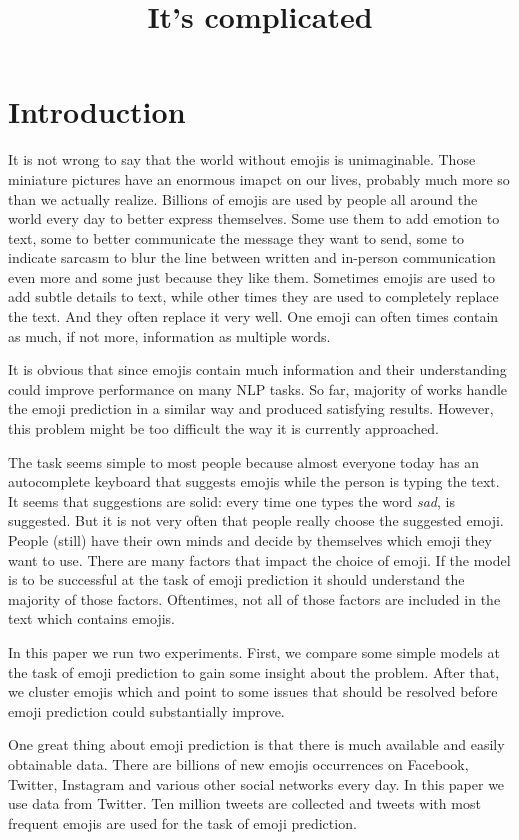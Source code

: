 \documentclass[10pt, a4paper]{article}
\title{It's complicated \emoji{1F384}}
\begin{document}
\maketitleabstract

\section{Introduction}
It is not wrong to say that the world without emojis is unimaginable. Those 
miniature pictures have an enormous imapct on our lives, probably much more so than
we actually realize. Billions of emojis are used by people all around the world 
every day to better express themselves. Some use them to add emotion to text, 
some to better communicate the message they want to send, some to indicate 
sarcasm to blur the line between written and in-person communication even more 
and some just because they like them. Sometimes emojis are used to add subtle 
details to text, while other times they are used to completely replace the text.
And they often replace it very well. One emoji can often times contain as much, 
if not more, information as multiple words.

It is obvious that since emojis contain much information and their understanding
could improve performance on many NLP tasks. So far, majority of works handle 
the emoji prediction in a similar way and produced satisfying results. However, 
this problem might be too difficult the way it is currently approached. 

The task seems simple to most people because almost everyone today has an 
autocomplete keyboard that suggests emojis while the person is typing the text. 
It seems that suggestions are solid: every time one types the word \emph{sad}, 
 is suggested. But it is not very often that people really choose 
the suggested emoji. People (still) have their own minds and decide by 
themselves which emoji they want to use. There are many factors that impact the 
choice of emoji. If the model is to be successful at the task of emoji 
prediction it should understand the majority of those factors. Oftentimes, not 
all of those factors are included in the text which contains emojis.

In this paper we run two experiments. First, we compare some simple models at 
the task of emoji prediction to gain some insight about the problem. After that, 
we cluster emojis which and point to some issues that should be resolved before
emoji prediction could substantially improve.

One great thing about emoji prediction is that there is much available and 
easily obtainable data. There are billions of new emojis occurrences on 
Facebook, Twitter, Instagram and various other social networks every day. In 
this paper we use data from Twitter. Ten million tweets are collected and tweets
with most frequent emojis are used for the task of emoji prediction.
\end{document}
